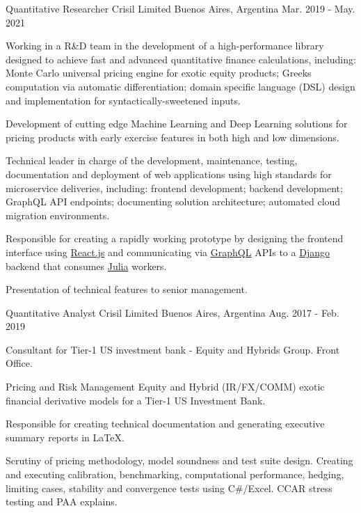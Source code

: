 \begin{cventries}
  \cventry
    {Quantitative Researcher} %
    {Crisil Limited} %
    {Buenos Aires, Argentina} %
    {Mar. 2019 - May. 2021} %
    {
      \begin{cvitems} %
          \item{Working in a R\&D team in the development of a high-performance library designed to achieve fast and advanced quantitative finance calculations, including: Monte Carlo universal pricing engine for exotic equity products; Greeks computation via automatic differentiation; domain specific language (DSL) design and implementation for syntactically-sweetened inputs.}
          \item{Development of cutting edge Machine Learning and Deep Learning solutions for pricing products with early exercise features in both high and low dimensions.}
          \item {Technical leader in charge of the development, maintenance, testing, documentation and deployment of web applications using high standards for microservice deliveries, including: frontend development; backend development; GraphQL API endpoints; documenting solution architecture; automated cloud migration environments.}
          \item{Responsible for creating a rapidly working prototype by designing the frontend interface using \href{https://reactjs.org/}{React.js} and communicating via \href{https://graphql.org/}{GraphQL} APIs to a \href{https://www.djangoproject.com/}{Django} backend that consumes \href{https://julialang.org/}{Julia} workers.}
          \item{Presentation of technical features to senior management.}
      \end{cvitems}
    }

  \cventry
    {Quantitative Analyst} %
    {Crisil Limited} %
    {Buenos Aires, Argentina} %
    {Aug. 2017 - Feb. 2019} %
    {
      \begin{cvitems} %
        \item{Consultant for Tier-1 US investment bank - Equity and Hybrids Group. Front Office.}
        \item {Pricing and Risk Management Equity and Hybrid (IR/FX/COMM) exotic financial derivative models for a Tier-1 US Investment Bank.}
        \item {Responsible for creating technical documentation and generating executive summary reports in \LaTeX.}
        \item{Scrutiny of pricing methodology, model soundness and test suite design. Creating and executing calibration, benchmarking, computational performance, hedging, limiting cases, stability and convergence tests using C\#/Excel. CCAR stress testing and PAA explains.}
      \end{cvitems}
    }


\end{cventries}
